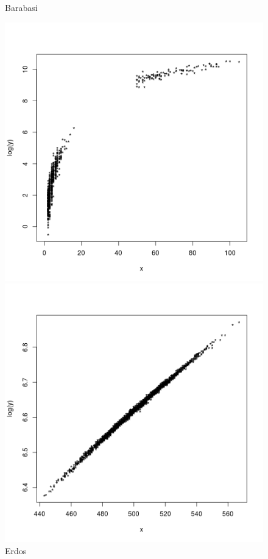 \documentclass[palatino]{apuntes}
\begin{document}
\begin{figure}[h!] 
\centering 
\begin{minipage}[b]{0.4\textwidth}
	\caption{Barabasi}
	\includegraphics[scale=0.45]{img/barabasi_grado-betweeness}
\end{minipage}
\hfill
\begin{minipage}[b]{0.4\textwidth}
	\caption{Erdos}
	\includegraphics[scale=0.45]{img/erdos_grado-betweeness}
\end{minipage}
\end{figure} 
\end{document}
